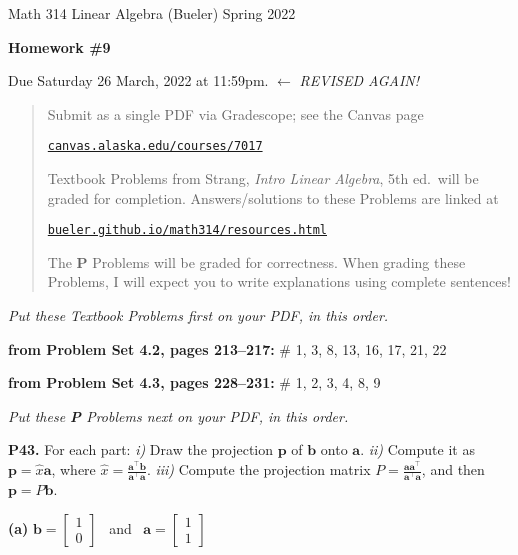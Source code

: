 \documentclass[12pt]{amsart}
\newcommand{\ba}{\bm{a}}
\newcommand{\bb}{\bm{b}}
\newcommand{\bp}{\bm{p}}
\newcommand{\ds}{\displaystyle}
\newcommand{\prob}[1]{\bigskip\noindent\textbf{#1.}\quad }
\newcommand{\probset}[2]{\bigskip\noindent\textbf{from Problem Set #1, pages #2:}\quad }
\newcommand{\epart}[1]{\medskip\noindent\textbf{(#1)}\quad }
\begin{document}
\scriptsize \noindent Math 314 Linear Algebra (Bueler) \hfill Spring 2022
\normalsize\medskip

\Large
\centerline{\textbf{Homework \#9}}

\bigskip
\large
\centerline{Due Saturday 26 March, 2022 at 11:59pm. \qquad $\gets$ \emph{REVISED AGAIN!}}

\normalsize
\bigskip
\begin{quote}
\medskip
\noindent Submit as a single PDF via Gradescope; see the Canvas page

\href{https://canvas.alaska.edu/courses/7017}{\texttt{canvas.alaska.edu/courses/7017}}

\noindent Textbook Problems from Strang, \emph{Intro Linear Algebra}, 5th ed.~will be graded for completion.  Answers/solutions to these Problems are linked at

\href{https://bueler.github.io/math314/resources.html}{\texttt{bueler.github.io/math314/resources.html}}

\noindent The \textbf{P} Problems will be graded for correctness.  When grading these Problems, I will expect you to write explanations using complete sentences!
\end{quote}
\medskip

\thispagestyle{empty}

\noindent \hrulefill

\noindent \emph{Put these Textbook Problems first on your PDF, in this order.}

\probset{4.2}{213--217} \# 1, 3, 8, 13, 16, 17, 21, 22

\probset{4.3}{228--231} \# 1, 2, 3, 4, 8, 9


\bigskip
\noindent \hrulefill

\noindent \emph{Put these \textbf{P} Problems next on your PDF, in this order.}

\prob{P43}  For each part: \emph{i)} Draw the projection $\bp$ of $\bb$ onto $\ba$.  \emph{ii)} Compute it as $\bp = \hat x \ba$, where $\ds \hat x = \frac{\ba^\top \bb}{\ba^\top \ba}$.  \emph{iii)} Compute the projection matrix $\ds P = \frac{\ba \ba^\top}{\ba^\top \ba}$, and then $\bp = P\bb$.

\epart{a}  $\ds \bb = \begin{bmatrix} 1 \\ 0 \end{bmatrix}$ \, and \, $\ds \ba = \begin{bmatrix} 1 \\ 1 \end{bmatrix}$
\end{document}

